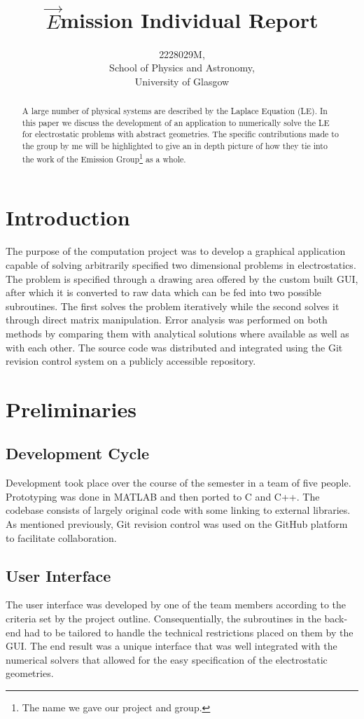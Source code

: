\documentclass[a4paper]{article}
\title{$\vec{E}$mission Individual Report}
\author{2228029M,\\
	School of Physics and Astronomy,\\
	University of Glasgow
}
\begin{document}
\maketitle

\begin{abstract}\noindent
	A large number of physical systems are described by the Laplace
	Equation (LE). In this paper we discuss the development of an
	application to numerically solve the LE for electrostatic problems with
	abstract geometries. The specific contributions made to the group by me
	will be highlighted to give an in depth picture of how they tie into
	the work of the Emission Group\footnote{The name we gave our project
	and group.} as a whole.
\end{abstract}

\section{Introduction}
The purpose of the computation project was to develop a graphical application
capable of solving arbitrarily specified two dimensional problems in
electrostatics. The problem is specified through a drawing area offered by the
custom built GUI, after which it is converted to raw data which can be fed into
two possible subroutines. The first solves the problem iteratively while the
second solves it through direct matrix manipulation. Error analysis was
performed on both methods by comparing them with analytical solutions where
available as well as with each other. The source code was distributed and
integrated using the Git revision control system on a publicly accessible
repository.

\section{Preliminaries}

\subsection{Development Cycle}
Development took place over the course of the semester in a team of five
people. Prototyping was done in MATLAB and then ported to C and C++. The
codebase consists of largely original code with some linking to external
libraries. As mentioned previously, Git revision control was used on the
GitHub platform to facilitate collaboration.  

\subsection{User Interface}
The user interface was developed by one of the team members according to the
criteria set by the project outline. Consequentially, the subroutines in the
back-end had to be tailored to handle the technical restrictions placed on them
by the GUI. The end result was a unique interface that was well integrated with
the numerical solvers that allowed for the easy specification of the
electrostatic geometries.
\end{document}
